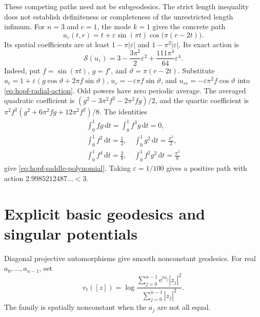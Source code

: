 These competing paths need not be subgeodesics. The strict length inequality does not establish definiteness or completeness of the unrestricted length infimum. For $n=3$ and $c=1$, the mode $k=1$ gives the concrete path
\[
 u_\varepsilon(t,r)=t+\varepsilon\sin(\pi t)\cos\bigl(\pi(r-2t)\bigr).
\]
Its spatial coefficients are at least $1-\pi|\varepsilon|$ and $1-\pi^2|\varepsilon|$. Its exact action is
\begin{equation}\label{eq:hopf-saddle-polynomial}
 \mathscr S(u_\varepsilon)
 =3-\frac{3\pi^2}2\varepsilon^2+\frac{111\pi^4}{64}\varepsilon^4.
\end{equation}
Indeed, put $f=\sin(\pi t)$, $g=f'$, and $\vartheta=\pi(r-2t)$. Substitute
$u_t=1+\varepsilon(g\cos\vartheta+2\pi f\sin\vartheta)$,
$u_r=-\varepsilon\pi f\sin\vartheta$, and $u_{rr}=-\varepsilon\pi^2f\cos\vartheta$ into \eqref{eq:hopf-radial-action}. Odd powers have zero periodic average. The averaged quadratic coefficient is $(g^2-3\pi^2f^2-2\pi^2fg)/2$, and the quartic coefficient is $\pi^2f^2(g^2+6\pi^2fg+12\pi^2f^2)/8$. The identities
\[
 \begin{gathered}
 \int_0^1fg\,\mathrm dt=\int_0^1f^3g\,\mathrm dt=0,
 \\
 \int_0^1f^2\,\mathrm dt=\frac12,
 \quad \int_0^1g^2\,\mathrm dt=\frac{\pi^2}2,\\
 \int_0^1f^4\,\mathrm dt=\frac38,
 \quad \int_0^1f^2g^2\,\mathrm dt=\frac{\pi^2}8
 \end{gathered}
\]
give \eqref{eq:hopf-saddle-polynomial}. Taking $\varepsilon=1/100$ gives a positive path with action $2.9985212487\ldots<3$.

\section{Explicit basic geodesics and singular potentials}

Diagonal projective automorphisms give smooth nonconstant geodesics. For real $a_0,\ldots,a_{n-1}$, set
\[
 v_t([z])=\log\frac{\sum_{j=0}^{n-1}\mathrm e^{ta_j}|z_j|^2}
 {\sum_{j=0}^{n-1}|z_j|^2}.
\]
The family is spatially nonconstant when the $a_j$ are not all equal.

